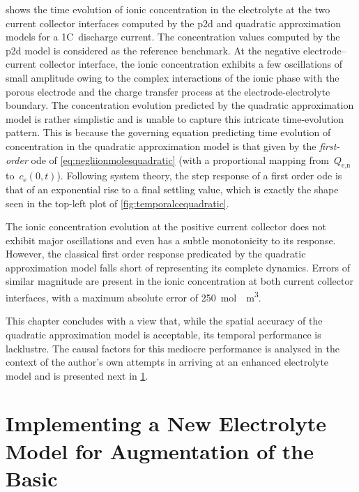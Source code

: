  shows  the time evolution of  ionic concentration
in  the electrolyte  at the  two current  collector interfaces  computed by  the
\gls{p2d} and  quadratic approximation  models for a  1C~discharge  current. The
concentration  values computed  by  the  \gls{p2d} model  is  considered as  the
reference benchmark. At the negative electrode--current collector interface, the
ionic  concentration  exhibits  a  few oscillations  of  small  amplitude  owing
to  the complex  interactions  of  the ionic  phase  with  the porous  electrode
and  the charge  transfer process  at the  electrode-electrolyte boundary.  The
concentration  evolution  predicted  by  the quadratic  approximation  model  is
rather  simplistic  and  is  unable to  capture  this  intricate  time-evolution
pattern.  This  is because  the  governing  equation predicting  time  evolution
of  concentration  in  the  quadratic  approximation  model  is  that  given  by
the  \emph{first-order}  \gls{ode} of \cref{eq:negliionmolesquadratic}  (with  a
proportional mapping from~$Q_\text{e,n}$ to~$c_\text{e}(0,t)$). Following system
theory, the step response  of a first order \gls{ode} is  that of an exponential
rise to a final settling value, which  is exactly the shape seen in the top-left
plot of \cref{fig:temporalcequadratic}.

The ionic  concentration evolution  at the positive  current collector  does not
exhibit major oscillations  and even has a subtle monotonicity  to its response.
However,  the  classical  first  order  response  predicated  by  the  quadratic
approximation model falls short of representing its complete dynamics. Errors of
similar  magnitude  are present  in  the  ionic  concentration at  both  current
collector  interfaces, with  a maximum  absolute error  of \approx\SI{250}{\mole
\per \meter  \cubed}.

This  chapter concludes  with a  view that,  while the  spatial accuracy  of the
quadratic  approximation  model  is  acceptable,  its  temporal  performance  is
lacklustre. The causal factors for this  mediocre performance is analysed in the
context of  the author's  own attempts  in arriving  at an  enhanced electrolyte
model and is presented next in \cref{ch:newelectrolytemodel}.

\setcounter{chapter}{5}

\clearpage
\chapter{Implementing a New Electrolyte Model for Augmentation of the Basic }\label{ch:newelectrolytemodel}
\startcontents[chapters]

